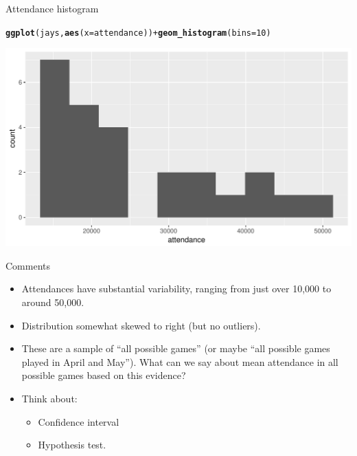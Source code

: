 \documentclass[unknownkeysallowed]{beamer}\usepackage[]{graphicx}\usepackage[]{color}
\makeatletter
\def\maxwidth{ %
  \ifdim\Gin@nat@width>\linewidth
    \linewidth
  \else
    \Gin@nat@width
  \fi
}
\newcommand{\hlnum}[1]{\textcolor[rgb]{0.686,0.059,0.569}{#1}}%
\newcommand{\hlopt}[1]{\textcolor[rgb]{0,0,0}{#1}}%
\newcommand{\hlstd}[1]{\textcolor[rgb]{0.345,0.345,0.345}{#1}}%
\newcommand{\hlkwc}[1]{\textcolor[rgb]{0.333,0.667,0.333}{#1}}%
\newcommand{\hlkwd}[1]{\textcolor[rgb]{0.737,0.353,0.396}{\textbf{#1}}}%
\newenvironment{kframe}{%
 \def\at@end@of@kframe{}%
 \ifinner\ifhmode%
  \def\at@end@of@kframe{\end{minipage}}%
  \begin{minipage}{\columnwidth}%
 \fi\fi%
 \def\FrameCommand##1{\hskip\@totalleftmargin \hskip-\fboxsep
 \colorbox{shadecolor}{##1}\hskip-\fboxsep
     \hskip-\linewidth \hskip-\@totalleftmargin \hskip\columnwidth}%
 \MakeFramed {\advance\hsize-\width
   \@totalleftmargin\z@ \linewidth\hsize
   \@setminipage}}%
 {\par\unskip\endMakeFramed%
 \at@end@of@kframe}
\newenvironment{knitrout}{}{} %
\makeatother
\begin{document}
\begin{frame}[fragile]{Attendance histogram}
\begin{knitrout}
\color{fgcolor}\begin{kframe}
\begin{alltt}
\hlkwd{ggplot}\hlstd{(jays,}\hlkwd{aes}\hlstd{(}\hlkwc{x}\hlstd{=attendance))}\hlopt{+}\hlkwd{geom_histogram}\hlstd{(}\hlkwc{bins}\hlstd{=}\hlnum{10}\hlstd{)}
\end{alltt}
\end{kframe}
\includegraphics[width=\maxwidth]{figure/unnamed-chunk-50-1} 

\end{knitrout}

\end{frame}

\begin{frame}[fragile]{Comments}
  
  \begin{itemize}
  \item Attendances have substantial variability, ranging from just
    over 10,000 to around 50,000.
  \item Distribution somewhat skewed to right (but no outliers).
  \item These are a sample of ``all possible games'' (or maybe ``all
    possible games played in April and May''). What can we say about
    mean attendance in all possible games based on this evidence?
  \item Think about:
    \begin{itemize}
    \item Confidence interval
    \item Hypothesis test.
    \end{itemize}
  \end{itemize}
  
\end{frame}
\end{document}
